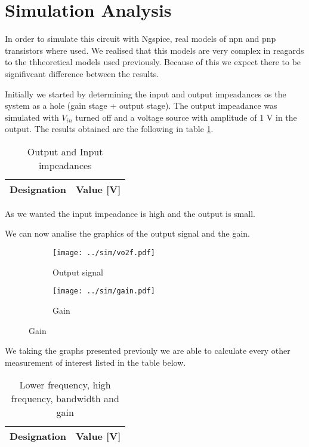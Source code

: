 \section{Simulation Analysis} \label{sec:simulation}

In order to simulate this circuit with Ngspice, real models of npn and pnp transistors where used. We realised that this models are very complex in reagards to the thheoretical models used previously. Because of this we expect there to be signifivcant difference between the results.
\par
Initially we started by determining the input and output impeadances os the system as a hole (gain stage + output stage). The output impeadance was simulated with $V_{in}$ turned off and a voltage source with amplitude of 1 V in the output. The results obtained are the following in table \ref{tab:impe}.

\begin{table}[H]
  \centering
  \begin{tabular}{|c|c|}
    \hline
        {\bf Designation} & {\bf Value [V]} \\ \hline
        
  \end{tabular}
  \caption{Output and Input impeadances} 
  \label{tab:impe}
\end{table}

As we wanted the input impeadance is high and the output is small. \par
We can now analise the graphics of the output signal and the gain.

\begin{figure}[H]
  \begin{subfigure}{.49\linewidth}
    \centering
    \texttt{[image: ../sim/vo2f.pdf]}
    \footnotesize
  \caption{Output signal}
   \label{fig:out1}
  \end{subfigure}
  \hspace{5mm}
  \begin{subfigure}{.49\linewidth}
    \centering
  \texttt{[image: ../sim/gain.pdf]}
  \caption{Gain}
  \label{fig:out2}
  \end{subfigure}
\end{figure}

We taking the graphs presented previouly we are able to calculate every other measurement of interest listed in the table below. 

\begin{table}[H]
  \centering
  \begin{tabular}{|c|c|}
    \hline
        {\bf Designation} & {\bf Value [V]} \\ \hline
        
  \end{tabular}
  \caption{Lower frequency, high frequency, bandwidth and gain} 
  \label{tab:rip}
\end{table}



